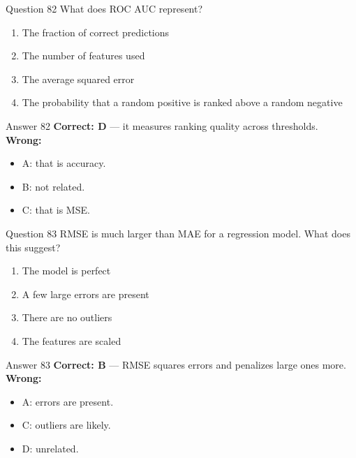 \documentclass[aspectratio=169,11pt]{beamer}
\begin{document}
	\begin{frame}{Question 82}
		What does ROC AUC represent?
		\begin{enumerate}[label=\Alph*.]
			\item The fraction of correct predictions
			\item The number of features used
			\item The average squared error
			\item The probability that a random positive is ranked above a random negative
		\end{enumerate}
	\end{frame}
	\begin{frame}{Answer 82}
		\textbf{Correct: D} --- it measures ranking quality across thresholds.\\
		\vspace{0.5em}
		\textbf{Wrong:}
		\begin{itemize}
			\item A: that is accuracy.
			\item B: not related.
			\item C: that is MSE.
		\end{itemize}
	\end{frame}
	
	\begin{frame}{Question 83}
		RMSE is much larger than MAE for a regression model. What does this suggest?
		\begin{enumerate}[label=\Alph*.]
			\item The model is perfect
			\item A few large errors are present
			\item There are no outliers
			\item The features are scaled
		\end{enumerate}
	\end{frame}
	\begin{frame}{Answer 83}
		\textbf{Correct: B} --- RMSE squares errors and penalizes large ones more.\\
		\vspace{0.5em}
		\textbf{Wrong:}
		\begin{itemize}
			\item A: errors are present.
			\item C: outliers are likely.
			\item D: unrelated.
		\end{itemize}
	\end{frame}
	
\end{document}
